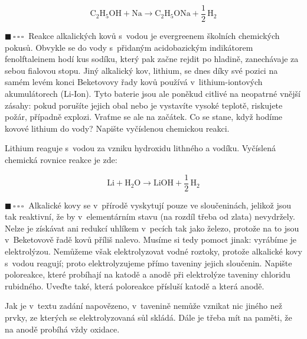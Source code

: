 \documentclass{book}
\newcommand{\jeden}{$\blacksquare \, \square \, \square \, \square \; \; $}
\renewenvironment{quotation}{\par}{\par} %
\begin{document}
\[
\mathrm{C_{2}H_{5}OH+Na\rightarrow C_{2}H_{5}ONa+\frac{1}{2}\,H_{2}}
\]


\hrulefill %
\begin{quotation}
\jeden Reakce alkalických kovů s~vodou je evergreenem školních chemických
pokusů. Obvykle se do vody s~přidaným acidobazickým indikátorem fenolftaleinem
hodí kus sodíku, který pak začne rejdit po hladině, zanechávaje za
sebou fialovou stopu. Jiný alkalický kov, lithium, se dnes díky své
pozici na samém levém konci Beketovovy řady kovů používá v~lithium-iontových
akumulátorech (Li-Ion). Tyto baterie jsou ale poněkud citlivé na neopatrné
vnější zásahy: pokud porušíte jejich obal nebo je vystavíte vysoké
teplotě, riskujete požár, případně explozi. Vraťme se ale na začátek.
Co se stane, když hodíme kovové lithium do vody? Napište vyčíslenou
chemickou reakci.
\end{quotation} \dotfill \par 
Lithium reaguje s~vodou za vzniku hydroxidu lithného a vodíku. Vyčíslená chemická rovnice reakce je zde:

\[
\mathrm{Li+H_{2}O\rightarrow LiOH+\frac{1}{2}\,H_{2}}
\]

\hrulefill %
\begin{quotation}
\jeden Alkalické  kovy se v~přírodě vyskytují pouze ve sloučeninách, jelikož jsou tak reaktivní,
že by v~elementárním stavu (na rozdíl třeba od zlata) nevydržely.
Nelze je získávat ani redukcí uhlíkem v~pecích tak jako železo, protože
na to jsou v\ Beketovově řadě kovů příliš nalevo. Musíme si tedy
pomoct jinak: vyrábíme je elektrolýzou. Nemůžeme však elektrolyzovat
vodné roztoky, protože alkalické kovy s~vodou reagují; proto elektrolyzujeme
přímo taveniny jejich sloučenin. Napište poloreakce, které probíhají na
katodě a anodě při elektrolýze taveniny chloridu rubidného. Uveďte
také, která poloreakce přísluší katodě a která anodě.
\end{quotation} \dotfill \par 
\newpage %
Jak je v~textu zadání napovězeno, v~tavenině nemůže vznikat nic jiného
než prvky, ze kterých se elektrolyzovaná sůl skládá. Dále je třeba
mít na paměti, že na anodě probíhá vždy oxidace. 
\end{document}
